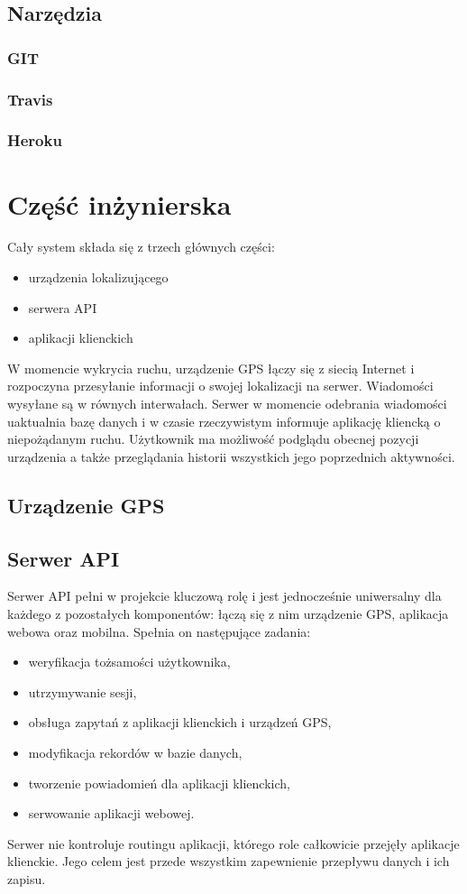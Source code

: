 \documentclass[eng,printmode]{mgr}
\begin{document}
\section{Narzędzia}
\subsection{GIT}
\subsection{Travis}
\subsection{Heroku}

\chapter{Część inżynierska}
Cały system składa się z trzech głównych części:
\begin{itemize}
\item urządzenia lokalizującego
\item serwera API
\item aplikacji klienckich
\end{itemize}

W momencie wykrycia ruchu, urządzenie GPS łączy się z siecią Internet i rozpoczyna przesyłanie informacji o swojej lokalizacji na serwer. Wiadomości wysyłane są w równych interwałach. Serwer w momencie odebrania wiadomości uaktualnia bazę danych i w czasie rzeczywistym informuje aplikację kliencką o niepożądanym ruchu. Użytkownik ma możliwość podglądu obecnej pozycji urządzenia a także przeglądania historii wszystkich jego poprzednich aktywności.



\section{Urządzenie GPS}

\section{Serwer API}
Serwer API pełni w projekcie kluczową rolę i jest jednocześnie uniwersalny dla każdego z pozostałych komponentów: łączą się z nim urządzenie GPS, aplikacja webowa oraz mobilna. Spełnia on następujące zadania:
\begin{itemize}
\item weryfikacja tożsamości użytkownika,
\item utrzymywanie sesji,
\item obsługa zapytań z aplikacji klienckich i urządzeń GPS,
\item modyfikacja rekordów w bazie danych,
\item tworzenie powiadomień dla aplikacji klienckich,
\item serwowanie aplikacji webowej.
\end{itemize}
Serwer nie kontroluje routingu aplikacji, którego role całkowicie przejęły aplikacje klienckie. Jego celem jest przede wszystkim zapewnienie przepływu danych i ich zapisu.
\end{document}
